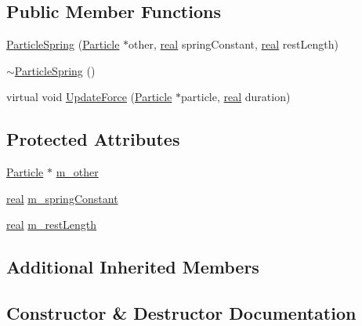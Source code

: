 \subsection*{Public Member Functions}
\begin{DoxyCompactItemize}
\item 
\hyperlink{classrum_1_1_particle_spring_af66a4191e6d0e567d0f88cc60f398c63}{Particle\+Spring} (\hyperlink{classrum_1_1_particle}{Particle} $\ast$other, \hyperlink{namespacerum_a7e8cca23573d5eaead0f138cbaa4862c}{real} spring\+Constant, \hyperlink{namespacerum_a7e8cca23573d5eaead0f138cbaa4862c}{real} rest\+Length)
\item 
\hyperlink{classrum_1_1_particle_spring_ac48ba65487b023ea754b4e0e8a33dafc}{$\sim$\+Particle\+Spring} ()
\item 
virtual void \hyperlink{classrum_1_1_particle_spring_aed78e527b0a96a392fe5d9e1ffa50ca6}{Update\+Force} (\hyperlink{classrum_1_1_particle}{Particle} $\ast$particle, \hyperlink{namespacerum_a7e8cca23573d5eaead0f138cbaa4862c}{real} duration)
\end{DoxyCompactItemize}
\subsection*{Protected Attributes}
\begin{DoxyCompactItemize}
\item 
\hyperlink{classrum_1_1_particle}{Particle} $\ast$ \hyperlink{classrum_1_1_particle_spring_aa09612b88d608ed80225c05baddfc0a3}{m\+\_\+other}
\item 
\hyperlink{namespacerum_a7e8cca23573d5eaead0f138cbaa4862c}{real} \hyperlink{classrum_1_1_particle_spring_ab799a061ff48edc65244d2df25a443ee}{m\+\_\+spring\+Constant}
\item 
\hyperlink{namespacerum_a7e8cca23573d5eaead0f138cbaa4862c}{real} \hyperlink{classrum_1_1_particle_spring_a4e126e603b40716ece3ef38108290dae}{m\+\_\+rest\+Length}
\end{DoxyCompactItemize}
\subsection*{Additional Inherited Members}


\subsection{Constructor \& Destructor Documentation}
\mbox{\label{classrum_1_1_particle_spring_af66a4191e6d0e567d0f88cc60f398c63}} 
